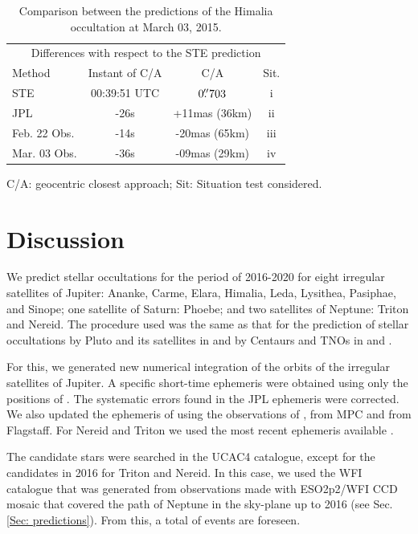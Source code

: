 \documentclass[useAMS,usenatbib]{mn2e}
\begin{document}
\begin{table}
\caption{\label{Tab: comparison-Himalia} Comparison between the predictions of the Himalia occultation at March 03, 2015.}
\begin{centering}
\begin{tabular}{lccc}
\hline  \hline
\multicolumn{4}{c}{Differences with respect to the STE prediction} \tabularnewline
Method  & Instant of C/A  & C/A & Sit.   \tabularnewline
\hline
STE & 00:39:51 UTC & $0\hbox{$.\!\!^{\prime\prime}$}703$ & i \tabularnewline
JPL & -26s & +11mas (36km) & ii \tabularnewline %
Feb. 22 Obs. & -14s & -20mas (65km) & iii \tabularnewline %
Mar. 03 Obs. & -36s & -09mas (29km) & iv \tabularnewline %
\hline
\end{tabular}
\par\end{centering}
C/A: geocentric closest approach; Sit: Situation test considered.
\end{table}

\section{Discussion} \label{Sec: discussion}

We predict stellar occultations for the period of 2016-2020 for eight irregular satellites of Jupiter: Ananke, Carme, Elara, Himalia, Leda, Lysithea, Pasiphae, and Sinope; one satellite of Saturn: Phoebe; and two satellites of Neptune: Triton and Nereid. The procedure used was the same as that for the prediction of stellar occultations by Pluto and its satellites in \cite{Assafin2010} and by Centaurs and TNOs in \cite{Assafin2012} and \cite{Camargo2014}.

For this, we generated new numerical integration of the orbits of the irregular satellites of Jupiter. A specific short-time ephemeris were obtained using only the positions of \cite{GomesJunior2015}. The systematic errors found in the JPL ephemeris \citep{Jacobson2012} were corrected. We also updated the ephemeris of \cite{Desmars2013} using the observations of \cite{GomesJunior2015}, from MPC and from Flagstaff. For Nereid and Triton we used the most recent ephemeris available \citep[, respectively]{Emelyanov2011, Emelyanov2015}.

The candidate stars were searched in the UCAC4 catalogue, except for the candidates in 2016 for Triton and Nereid. In this case, we used the WFI catalogue that was generated from observations made with ESO2p2/WFI CCD mosaic that covered the path of Neptune in the sky-plane up to 2016 (see Sec. \ref{Sec: predictions}). From this, a total of \noccs events are foreseen. 
\end{document}
